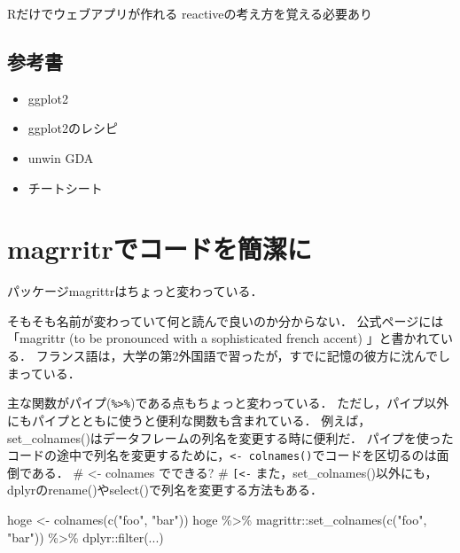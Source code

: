 \documentclass[
]{article}
\newenvironment{Shaded}{\begin{snugshade}}{\end{snugshade}}
\newcommand{\FunctionTok}[1]{\textcolor[rgb]{0.00,0.00,0.00}{#1}}
\newcommand{\NormalTok}[1]{#1}
\newcommand{\OtherTok}[1]{\textcolor[rgb]{0.56,0.35,0.01}{#1}}
\newcommand{\SpecialCharTok}[1]{\textcolor[rgb]{0.00,0.00,0.00}{#1}}
\newcommand{\StringTok}[1]{\textcolor[rgb]{0.31,0.60,0.02}{#1}}
\providecommand{\tightlist}{%
  \setlength{\itemsep}{0pt}\setlength{\parskip}{0pt}}
\begin{document}
Rだけでウェブアプリが作れる
reactiveの考え方を覚える必要あり

\hypertarget{ux53c2ux8003ux66f8}{%
\subsection{参考書}\label{ux53c2ux8003ux66f8}}

\begin{itemize}
\tightlist
\item
  ggplot2
\item
  ggplot2のレシピ
\item
  unwin GDA
\item
  チートシート
\end{itemize}

\hypertarget{magrittr}{%
\section{magrritrでコードを簡潔に}\label{magrittr}}

パッケージmagrittrはちょっと変わっている．

そもそも名前が変わっていて何と読んで良いのか分からない．
公式ページには「magrittr (to be pronounced with a sophisticated french accent) 」と書かれている．
フランス語は，大学の第2外国語で習ったが，すでに記憶の彼方に沈んでしまっている．

主な関数がパイプ(\texttt{\%\textgreater{}\%})である点もちょっと変わっている．
ただし，パイプ以外にもパイプとともに使うと便利な関数も含まれている．
例えば，set\_colnames()はデータフレームの列名を変更する時に便利だ．
パイプを使ったコードの途中で列名を変更するために，\texttt{\textless{}-\ colnames()}でコードを区切るのは面倒である．
\# \textless- colnames でできる?
\# \texttt{{[}\textless{}-}
また，set\_colnames()以外にも，dplyrのrename()やselect()で列名を変更する方法もある．

\begin{Shaded}
\begin{Highlighting}[]
\NormalTok{hoge }\OtherTok{\textless{}{-}} \FunctionTok{colnames}\NormalTok{(}\FunctionTok{c}\NormalTok{(}\StringTok{"foo"}\NormalTok{, }\StringTok{"bar"}\NormalTok{))}
\NormalTok{hoge  }\SpecialCharTok{\%\textgreater{}\%}
\NormalTok{  magrittr}\SpecialCharTok{::}\FunctionTok{set\_colnames}\NormalTok{(}\FunctionTok{c}\NormalTok{(}\StringTok{"foo"}\NormalTok{, }\StringTok{"bar"}\NormalTok{)) }\SpecialCharTok{\%\textgreater{}\%}
\NormalTok{  dplyr}\SpecialCharTok{::}\FunctionTok{filter}\NormalTok{(...)}
\end{Highlighting}
\end{Shaded}
\end{document}
